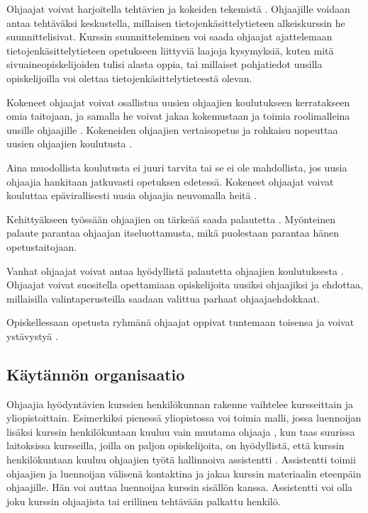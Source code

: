 \documentclass[finnish]{tktltiki2}
\theoremstyle{definition}
\theoremstyle{remark}
\begin{document}
Ohjaajat voivat harjoitella tehtävien ja kokeiden tekemistä \cite{Kay95}. Ohjaajille voidaan antaa tehtäväksi keskustella, millaisen tie\-to\-jen\-kä\-sit\-te\-ly\-tie\-teen alkeiskurssin he suunnittelisivat. Kurssin suunnitteleminen voi saada ohjaajat ajattelemaan tietojenkäsittelytieteen opetukseen liittyviä laajoja kysymyksiä, kuten mitä sivuaineopiskelijoiden tulisi alasta oppia, tai millaiset pohjatiedot uusilla opiskelijoilla voi olettaa tietojenkäsittelytieteestä olevan.  \par

Kokeneet ohjaajat voivat osallistua uusien ohjaajien koulutukseen kerratakseen omia taitojaan, ja samalla he voivat jakaa kokemustaan ja toimia roolimalleina uusille ohjaajille \cite{Reges88}. Kokeneiden ohjaajien vertaisopetus ja rohkaisu nopeuttaa uusien ohjaajien koulutusta \cite{Decker06}.  \par

Aina muodollista koulutusta ei juuri tarvita tai se ei ole mahdollista, jos uusia ohjaajia hankitaan jatkuvasti opetuksen edetessä. Kokeneet ohjaajat voivat kouluttaa epävirallisesti uusia ohjaajia neuvomalla heitä \cite{Kurhila11}.  \par

Kehittyäkseen työssään ohjaajien on tärkeää saada palautetta \cite{Patitsas12, Patitsas12_3}. Myönteinen palaute parantaa ohjaajan itseluottamusta, mikä puolestaan parantaa hänen opetustaitojaan.  \par

Vanhat ohjaajat voivat antaa hyödyllistä palautetta ohjaajien koulutuksesta \cite{Decker06}. Ohjaajat voivat suositella opettamiaan opiskelijoita uusiksi ohjaajiksi ja ehdottaa, millaisilla valintaperusteilla saadaan valittua parhaat ohjaajaehdokkaat.  \par

Opiskellessaan opetusta ryhmänä ohjaajat oppivat tuntemaan toisensa ja voivat ystävystyä \cite{Roberts95}. \par


\subsection{Käytännön organisaatio}

Ohjaajia hyödyntävien kurssien henkilökunnan rakenne vaihtelee kursseittain ja yliopistoittain. Esimerkiksi pienessä yliopistossa voi toimia malli, jossa luennoijan lisäksi kurssin henkilökuntaan kuuluu vain muutama ohjaaja \cite{Dickson11}, kun taas suurissa laitoksissa kursseilla, joilla on paljon opiskelijoita, on hyödyllistä, että kurssin henkilökuntaan kuuluu ohjaajien työtä hallinnoiva assistentti \cite{Reges03}. Assistentti toimii ohjaajien ja luennoijan välisenä kontaktina ja jakaa kurssin materiaalin eteenpäin ohjaajille. Hän voi auttaa luennoijaa kurssin sisällön kanssa. Assistentti voi olla joku kurssin ohjaajista tai erillinen tehtävään palkattu henkilö. \par
\end{document}
